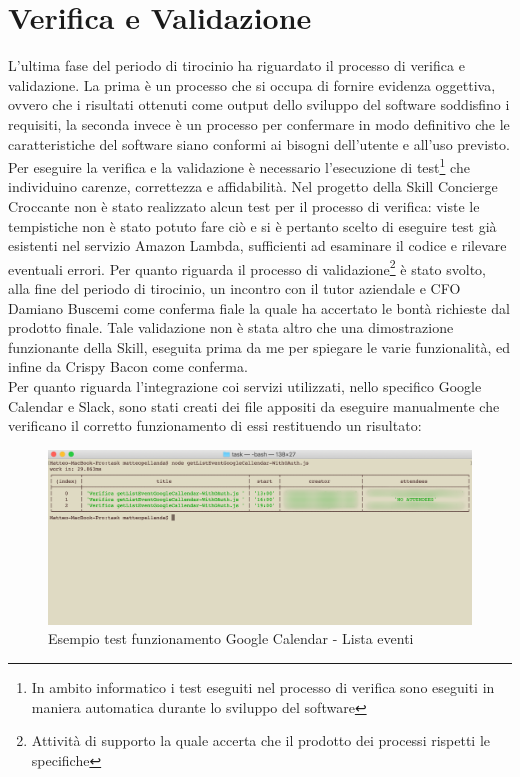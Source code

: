 \newpage
\section{Verifica e Validazione}
\label{cap:verifica_validazione}
L'ultima fase del periodo di tirocinio ha riguardato il processo di verifica e validazione. La prima è un processo che si occupa di fornire evidenza oggettiva, ovvero che i risultati ottenuti come output dello sviluppo del software soddisfino i requisiti, la seconda invece è un processo per confermare in modo definitivo che le caratteristiche del software siano conformi ai bisogni dell'utente e all'uso previsto.
Per eseguire la verifica e la validazione è necessario l'esecuzione di test\footnote{In ambito informatico i test eseguiti nel processo di verifica sono eseguiti in maniera automatica durante lo sviluppo del software} che individuino carenze, correttezza e affidabilità. Nel progetto della Skill Concierge Croccante non è stato realizzato alcun test per il processo di verifica: viste le tempistiche non è stato potuto fare ciò e si è pertanto scelto di eseguire test già esistenti nel servizio Amazon Lambda, sufficienti ad esaminare il codice e rilevare eventuali errori. Per quanto riguarda il processo di validazione\footnote{Attività di supporto la quale accerta che il prodotto dei processi rispetti le specifiche} è stato svolto, alla fine del periodo di tirocinio, un incontro  con il tutor aziendale e CFO Damiano Buscemi come conferma fiale la quale ha accertato le bontà richieste dal prodotto finale. Tale validazione non è stata altro che una dimostrazione funzionante della Skill, eseguita prima da me per spiegare le varie funzionalità, ed infine da Crispy Bacon come conferma.
\\[0.5cm]
\noindent Per quanto riguarda l'integrazione coi servizi utilizzati, nello specifico Google Calendar e Slack, sono stati creati dei file appositi da eseguire manualmente che verificano il corretto funzionamento di essi restituendo un risultato:
\\[0.1cm]
\begin{figure}[H]
	\includegraphics[width=13.2cm]{immagini/test-googleCalendar.png}
	\caption{\label{fig:test_googleCalendar}Esempio test funzionamento Google Calendar - Lista eventi}
\end{figure}
